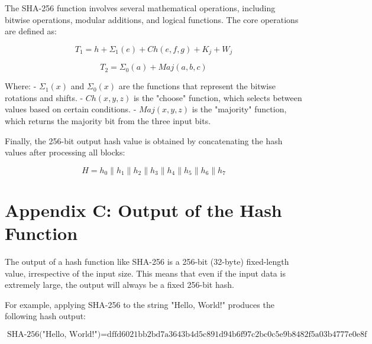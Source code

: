 The SHA-256 function involves several mathematical operations, including bitwise operations, modular additions, and logical functions. The core operations are defined as:

\[
T_1 = h + \Sigma_1(e) + Ch(e,f,g) + K_j + W_j
\]

\[
T_2 = \Sigma_0(a) + Maj(a,b,c)
\]

Where:
- \( \Sigma_1(x) \) and \( \Sigma_0(x) \) are the functions that represent the bitwise rotations and shifts.
- \( Ch(x, y, z) \) is the "choose" function, which selects between values based on certain conditions.
- \( Maj(x, y, z) \) is the "majority" function, which returns the majority bit from the three input bits.

Finally, the 256-bit output hash value is obtained by concatenating the hash values after processing all blocks:

\[
H = h_0 \parallel h_1 \parallel h_2 \parallel h_3 \parallel h_4 \parallel h_5 \parallel h_6 \parallel h_7
\]

\clearpage
\fancyhead[]{}
\fancyhead[LE,RO]{\thepage}
\section*{\centering Appendix C: Output of the Hash Function}

The output of a hash function like SHA-256 is a 256-bit (32-byte) fixed-length value, irrespective of the input size. This means that even if the input data is extremely large, the output will always be a fixed 256-bit hash.

For example, applying SHA-256 to the string "Hello, World!" produces the following hash output:

\[
\text{SHA-256("Hello, World!")} = \text{dffd6021bb2bd7a3643b4d5c891d94b6f97c2bc0c5e9b8482f5a03b4777e0e8f}
\]
\clearpage